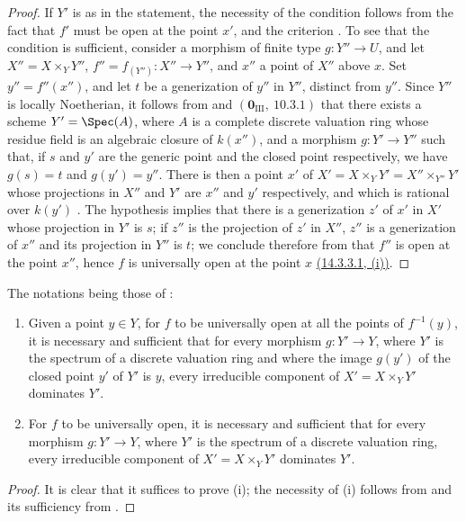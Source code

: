 \begin{proof}
If $Y'$ is as in the statement, the necessity of the condition follows from the fact that $f'$ must be open at the point $x'$, and the criterion .
To see that the condition is sufficient, consider a morphism of finite type $g:Y''\to U$, and let $X''=X\times_Y Y''$, $f''=f_{(Y'')}:X''\to Y''$, and $x''$ a point of $X''$ above $x$.
Set $y''=f''(x'')$, and let $t$ be a generization of $y''$ in $Y''$, distinct from $y''$.
Since $Y''$ is locally Noetherian, it follows from  and $(\mathbf{0}_{\mathrm{III}},~10.3.1)$ that there exists a scheme $Y'=\Spec(A)$, where $A$ is a complete discrete valuation ring whose residue field is an algebraic closure of $k(x'')$, and a morphism $g:Y'\to Y''$ such that, if $s$ and $y'$ are the generic point and the closed point respectively, we have $g(s)=t$ and $g(y')=y''$.
There is then a point $x'$ of $X'=X\times_Y Y'=X''\times_{Y''}Y'$ whose projections in $X''$ and $Y'$ are $x''$ and $y'$ respectively, and which is rational over $k(y')$ .
The hypothesis implies that there is a generization $z'$ of $x'$ in $X'$ whose projection in $Y'$ is $s$; if $z''$ is the projection of $z'$ in $X''$, $z''$ is a generization of $x''$ and its projection in $Y''$ is $t$; we conclude therefore from  that $f''$ is open at the point $x''$, hence $f$ is universally open at the point $x$ \hyperref[IV.14.3.3.1]{(14.3.3.1, (i))}.
\end{proof}

\begin{corollary}[14.3.7]
\label{IV.14.3.7}
The notations being those of :
\begin{enumerate}[label=(\roman*)]
  \item Given a point $y\in Y$, for $f$ to be universally open at all the points of $f^{-1}(y)$, it is necessary and sufficient that for every morphism $g:Y'\to Y$, where $Y'$ is the spectrum of a discrete valuation ring and where the image $g(y')$ of the closed point $y'$ of $Y'$ is $y$, every irreducible component of $X'=X\times_Y Y'$ dominates $Y'$.
  \item For $f$ to be universally open, it is necessary and sufficient that for every morphism $g:Y'\to Y$, where $Y'$ is the spectrum of a discrete valuation ring, every irreducible component of $X'=X\times_Y Y'$ dominates $Y'$.
\end{enumerate}
\end{corollary}

\begin{proof}
It is clear that it suffices to prove (i); the necessity of (i) follows from  and its sufficiency from .
\end{proof}


